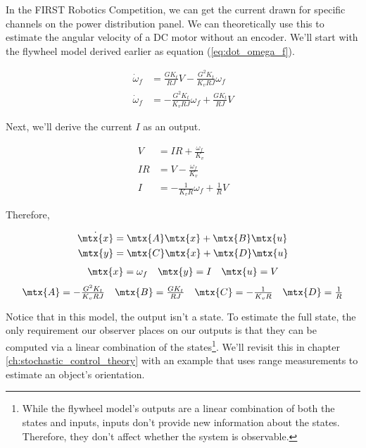 In the FIRST Robotics Competition, we can get the current drawn for specific
channels on the power distribution panel. We can theoretically use this to
estimate the angular velocity of a DC motor without an encoder. We'll start with
the flywheel model derived earlier as equation (\ref{eq:dot_omega_f}).

\begin{align*}
  \dot{\omega}_f &= \frac{G K_t}{RJ} V - \frac{G^2 K_t}{K_v RJ} \omega_f \\
  \dot{\omega}_f &= -\frac{G^2 K_t}{K_v RJ} \omega_f + \frac{G K_t}{RJ} V
\end{align*}

Next, we'll derive the current $I$ as an output.

\begin{align*}
  V &= IR + \frac{\omega_f}{K_v} \\
  IR &= V - \frac{\omega_f}{K_v} \\
  I &= -\frac{1}{K_v R} \omega_f + \frac{1}{R} V
\end{align*}

Therefore,

\begin{theorem}
  \begin{align*}
    \dot{\mtx{x}} &= \mtx{A} \mtx{x} + \mtx{B} \mtx{u} \\
    \mtx{y} &= \mtx{C} \mtx{x} + \mtx{D} \mtx{u}
  \end{align*}
  \begin{equation*}
    \begin{array}{ccc}
      \mtx{x} = \omega_f &
      \mtx{y} = I &
      \mtx{u} = V
    \end{array}
  \end{equation*}
  \begin{equation}
    \begin{array}{cccc}
      \mtx{A} = -\frac{G^2 K_t}{K_v RJ} &
      \mtx{B} = \frac{G K_t}{RJ} &
      \mtx{C} = -\frac{1}{K_v R} &
      \mtx{D} = \frac{1}{R}
    \end{array}
  \end{equation}
\end{theorem}

Notice that in this \gls{model}, the \gls{output} isn't a \gls{state}. To
estimate the full \gls{state}, the only requirement our \gls{observer} places on
our \glspl{output} is that they can be computed via a linear combination of the
\glspl{state}\footnote{While the flywheel model's outputs are a linear
combination of both the states and inputs, \glspl{input} don't provide new
information about the \glspl{state}. Therefore, they don't affect whether the
system is observable.}. We'll revisit this in chapter
\ref{ch:stochastic_control_theory} with an example that uses range measurements
to estimate an object's orientation.

